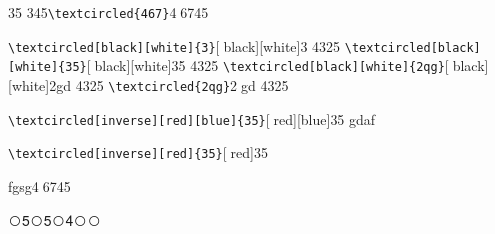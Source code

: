 \documentclass{article}
\begin{document}
35 345\verb|\textcircled{467}|\textcircled{467}45

 \verb|\textcircled[black][white]{3}|\textcircled[black][white]{3} 4325
   \verb|\textcircled[black][white]{35}|\textcircled[black][white]{35} 4325
  \verb|\textcircled[black][white]{2qg}|\textcircled[black][white]{2gd} 4325
    \verb|\textcircled{2qg}|\textcircled{2gd} 4325
 
  \verb|\textcircled[inverse][red][blue]{35}|\textcircled[red][blue]{35} gdaf
  
   \verb|\textcircled[inverse][red]{35}|\textcircled[red]{35}

fgsg\textcircled{467}45
   
\newcommand{\wcnt}{\textcircled{\themycnt}}

\wcnt5\wcnt5\wcnt4\wcnt\wcnt
\end{document}
